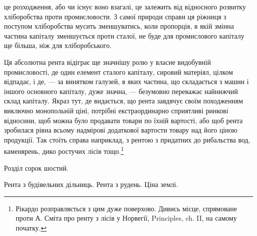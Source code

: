 \parcont{}  %
це розходження, або чи існує воно взагалі, це залежить від відносного розвитку хліборобства
проти промисловости. З самої природи справи ця ріжниця з поступом
хліборобства мусить зменшуватись, коли пропорція, в якій змінна частина
капіталу зменшується проти сталої, не буде для промислового капіталу ще
більша, ніж для хліборобського.

Ця абсолютна рента відіграє ще значнішу ролю у власне видобувній
промисловості, де один елемент сталого капіталу, сировий матеріял, цілком відпадає,
і де, — за винятком галузей, в яких частина, що складається з машин і
іншого основного капіталу, дуже значна, — безумовно переважає найнижчий
склад капіталу. Якраз тут, де видається, що рента завдячує своїм походженням
виключно монопольній ціні, потрібні екстраординарно сприятливі ринкові відносини,
щоб можна було продавати товари по їхній вартості, або щоб рента
зробилася рівна всьому надмірові додаткової вартости товару над його ціною
продукції. Так стоїть справа наприклад, з рентою з придатних до рибальства
вод, каменярень, дико ростучих лісів тощо.\footnote{
Рікардо розправляється з цим дуже поверхово. Дивись місце, спрямоване проти А. Сміта
про ренту з лісів у Норвегії, Principles, ch. II, на самому початку.
}

Розділ сорок шостий.

Рента з будівельних дільниць. Рента з рудень. Ціна землі.


